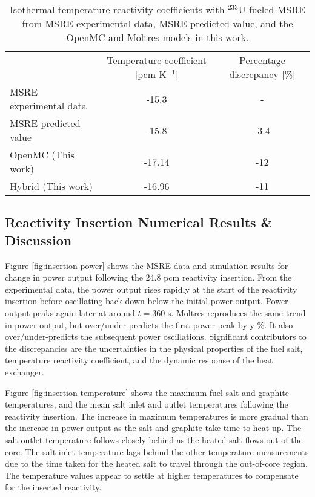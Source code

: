 \begin{table}[t]
  \small
  \centering
  \caption{Isothermal temperature reactivity coefficients with $^{233}$U-fueled \gls{MSRE} from
    \gls{MSRE} experimental data, \gls{MSRE} predicted value, and the OpenMC
  and Moltres models in this work.}
  \begin{tabular}{l S[separate-uncertainty=true,table-format=2.2(2)] S}
    \toprule
     & {Temperature coefficient [pcm K$^{-1}$]} & {Percentage discrepancy [\%]}\\
     \cmidrule(rl){2-2} \cmidrule(l){3-3}
    \gls{MSRE} experimental data & -15.3 & {-}\\
    \gls{MSRE} predicted value & -15.8 & -3.4 \\
    OpenMC (This work) & -17.14 & -12 \\
    Hybrid (This work) & -16.96 & -11 \\
    \bottomrule
  \end{tabular}
  \label{table:temp-coef-u233}
\end{table}

\subsection{Reactivity Insertion Numerical Results \& Discussion}

Figure \ref{fig:insertion-power} shows the \gls{MSRE} data and simulation results for change in
power output following the 24.8 pcm reactivity
insertion. From the experimental data, the power output rises rapidly at the start of the
reactivity insertion before oscillating back down below the initial power output. Power output
peaks again later at around $t=360$ s. Moltres reproduces the same trend in power output, but 
over/under-predicts the first power peak by y \%. It also over/under-predicts the subsequent power
oscillations.
Significant contributors to the discrepancies are the uncertainties in the physical properties of
the fuel salt, temperature reactivity coefficient, and the dynamic response of the heat exchanger.

Figure \ref{fig:insertion-temperature} shows the maximum fuel salt and graphite temperatures, and
the mean salt inlet and outlet
temperatures following the reactivity insertion. The increase in maximum temperatures is more
gradual than the increase in power output as the salt and graphite take time to heat up. The salt
outlet temperature follows closely behind as the heated salt flows out of the core. The salt inlet
temperature lags behind the other temperature measurements due to the time taken for the heated
salt to travel through the out-of-core region. The temperature values appear to settle at higher
temperatures to compensate for the inserted reactivity.

